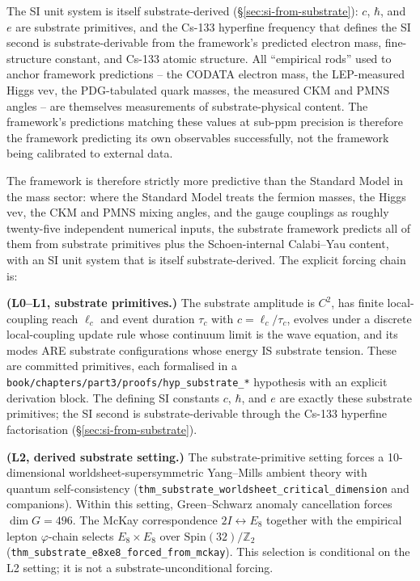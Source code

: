 ﻿\documentclass[reprint,amsmath,amssymb,aps,prd,longbibliography,floatfix]{revtex4-2}
\begin{document}
The SI unit system is itself substrate-derived
(\S\ref{sec:si-from-substrate}): $c$, $\hbar$, and $e$ are substrate
primitives, and the Cs-133 hyperfine frequency that defines the SI
second is substrate-derivable from the framework's predicted
electron mass, fine-structure constant, and Cs-133 atomic structure.
All ``empirical rods'' used to anchor framework predictions -- the
CODATA electron mass, the LEP-measured Higgs vev, the PDG-tabulated
quark masses, the measured CKM and PMNS angles -- are themselves
measurements of substrate-physical content. The framework's
predictions matching these values at sub-ppm precision is therefore
the framework predicting its own observables successfully, not the
framework being calibrated to external data.

The framework is therefore strictly more predictive than the
Standard Model in the mass sector: where the Standard Model treats
the fermion masses, the Higgs vev, the CKM and PMNS mixing angles,
and the gauge couplings as roughly twenty-five independent numerical
inputs, the substrate framework predicts all of them from substrate
primitives plus the Schoen-internal Calabi--Yau content, with an SI
unit system that is itself substrate-derived. The explicit forcing
chain is:

\textbf{(L0--L1, substrate primitives.)} The substrate amplitude is
$C^2$, has finite local-coupling reach $\ell_c$ and event duration
$\tau_c$ with $c = \ell_c / \tau_c$, evolves under a discrete
local-coupling update rule whose continuum limit is the wave equation,
and its modes ARE substrate configurations whose energy IS substrate
tension. These are committed primitives, each formalised in a
\texttt{book/chapters/part3/proofs/hyp\_substrate\_*} hypothesis with
an explicit derivation block. The defining SI constants $c$, $\hbar$,
and $e$ are exactly these substrate primitives; the SI second is
substrate-derivable through the Cs-133 hyperfine factorisation
(\S\ref{sec:si-from-substrate}).

\textbf{(L2, derived substrate setting.)} The substrate-primitive
setting forces a 10-dimensional worldsheet-supersymmetric Yang--Mills
ambient theory with quantum self-consistency
(\texttt{thm\_substrate\_worldsheet\_critical\_dimension} and
companions). Within this setting, Green--Schwarz anomaly cancellation
forces $\dim G = 496$. The McKay correspondence
$2I \leftrightarrow E_8$ together with the empirical lepton
$\varphi$-chain selects $E_8 \times E_8$ over
$\mathrm{Spin}(32)/\mathbb{Z}_2$
(\texttt{thm\_substrate\_e8xe8\_forced\_from\_mckay}). This selection
is conditional on the L2 setting; it is not a substrate-unconditional
forcing.
\end{document}
